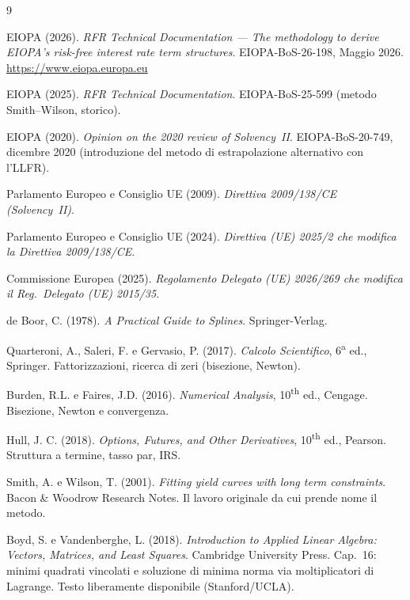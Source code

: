 \documentclass[11pt,a4paper]{article}
\theoremstyle{plain}
\theoremstyle{definition}
\theoremstyle{remark}
\begin{document}
\renewcommand{\refname}{Riferimenti bibliografici}
\begin{thebibliography}{9}

EIOPA (2026).
\textit{RFR Technical Documentation --- The methodology to derive EIOPA's risk-free
interest rate term structures}. EIOPA-BoS-26-198, Maggio 2026.
\url{https://www.eiopa.europa.eu}

EIOPA (2025).
\textit{RFR Technical Documentation}. EIOPA-BoS-25-599 (metodo Smith--Wilson, storico).

EIOPA (2020).
\textit{Opinion on the 2020 review of Solvency~II}. EIOPA-BoS-20-749, dicembre 2020
(introduzione del metodo di estrapolazione alternativo con l'LLFR).

Parlamento Europeo e Consiglio UE (2009).
\textit{Direttiva 2009/138/CE (Solvency~II)}.

Parlamento Europeo e Consiglio UE (2024).
\textit{Direttiva (UE) 2025/2 che modifica la Direttiva 2009/138/CE}.

Commissione Europea (2025).
\textit{Regolamento Delegato (UE) 2026/269 che modifica il Reg.\ Delegato (UE) 2015/35}.

de Boor, C. (1978).
\textit{A Practical Guide to Splines}. Springer-Verlag.

Quarteroni, A., Saleri, F. e Gervasio, P. (2017).
\textit{Calcolo Scientifico}, 6\textsuperscript{a} ed., Springer.
Fattorizzazioni, ricerca di zeri (bisezione, Newton).

Burden, R.L. e Faires, J.D. (2016).
\textit{Numerical Analysis}, 10\textsuperscript{th} ed., Cengage.
Bisezione, Newton e convergenza.

Hull, J. C. (2018).
\textit{Options, Futures, and Other Derivatives}, 10\textsuperscript{th} ed., Pearson.
Struttura a termine, tasso par, IRS.

Smith, A. e Wilson, T. (2001).
\textit{Fitting yield curves with long term constraints}.
Bacon \& Woodrow Research Notes. Il lavoro originale da cui prende nome il metodo.

Boyd, S. e Vandenberghe, L. (2018).
\textit{Introduction to Applied Linear Algebra: Vectors, Matrices, and Least Squares}.
Cambridge University Press.
Cap.~16: minimi quadrati vincolati e soluzione di minima norma via moltiplicatori di
Lagrange. Testo liberamente disponibile (Stanford/UCLA).


\end{thebibliography}
\end{document}

